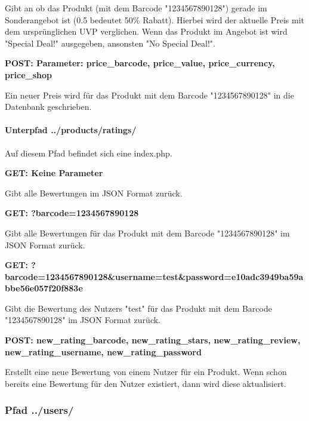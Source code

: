 \documentclass{scrartcl}
\begin{document}
\noindent Gibt an ob das Produkt (mit dem Barcode "1234567890128") gerade im Sonderangebot ist (0.5 bedeutet 50\% Rabatt). Hierbei wird der aktuelle Preis mit dem ursprünglichen UVP verglichen. Wenn das Produkt im Angebot ist wird "Special Deal!" ausgegeben, ansonsten "No Special Deal!". \newline

\noindent \textbf{POST: Parameter: price\_barcode, price\_value, price\_currency, price\_shop}

\noindent Ein neuer Preis wird für das Produkt mit dem Barcode "1234567890128" in die Datenbank geschrieben.

\paragraph{Unterpfad ../products/ratings/}
Auf diesem Pfad befindet sich eine index.php. \newline

\noindent \textbf{GET: Keine Parameter}

\noindent Gibt alle Bewertungen im JSON Format zurück. \newline

\noindent \textbf{GET: ?barcode=1234567890128}

\noindent Gibt alle Bewertungen für das Produkt mit dem Barcode "1234567890128" im JSON Format zurück. \newline

\noindent \textbf{GET: ?barcode=1234567890128\newline\&username=test\&password=e10adc3949ba59abbe56e057f20f883e}

\noindent Gibt die Bewertung des Nutzers "test" für das Produkt mit dem Barcode "1234567890128" im JSON Format zurück. \newline 

\noindent \textbf{POST: new\_rating\_barcode, new\_rating\_stars, \newline new\_rating\_review, new\_rating\_username, new\_rating\_password}

\noindent Erstellt eine neue Bewertung von einem Nutzer für ein Produkt. Wenn schon bereits eine Bewertung für den Nutzer existiert, dann wird diese aktualisiert.\newline  

\subsubsection{Pfad ../users/}
\end{document}
